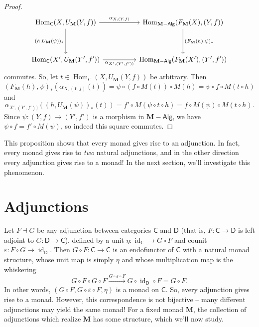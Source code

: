 \documentclass{article}
\theoremstyle{definition}
\newcommand{\C}{\mathsf{C}}
\newcommand{\D}{\mathsf{D}}
\newcommand{\M}{\mathbf{M}}
\DeclareMathOperator{\id}{id}
\newcommand{\Alg}{\mathsf{Alg}}
\DeclareMathOperator{\Hom}{Hom}
\begin{document}
\begin{proof}
    \[\begin{tikzcd}[ampersand replacement=\&]
    	{\Hom_{\C}(X,U_{\M}(Y,f))} \&\& {\Hom_{\M{-}\Alg}(F_{\M}(X),(Y,f))} \\
    	\\
    	{\Hom_{\C}(X',U_{\M}(Y',f'))} \&\& {\Hom_{\M{-}\Alg}(F_{\M}(X'),(Y',f'))}
    	\arrow["{\alpha_{X,(Y,f)}}", from=1-1, to=1-3]
    	\arrow["{(h,U_{\M}(\psi))_*}"', from=1-1, to=3-1]
    	\arrow["{\alpha_{X',(Y',f'))}}"', from=3-1, to=3-3]
    	\arrow["{(F_{\M}(h),\psi)_*}", from=1-3, to=3-3]
    \end{tikzcd}\]
    commutes. So, let $t \in {\Hom_{\C}(X,U_{\M}(Y,f))}$ be arbitrary. Then
    \[(F_{\M}(h),\psi)_*(\alpha_{X,(Y,f)}(t)) = \psi \circ (f \circ M(t)) \circ M(h) = \psi \circ f \circ M(t \circ h)\]
    and
    \[\alpha_{X',(Y',f'))}((h,U_{\M}(\psi))_*(t)) = f' \circ M(\psi \circ t \circ h) = f \circ M(\psi) \circ M(t \circ h).\]
    Since $\psi : (Y,f) \to (Y',f')$ is a morphism in $\M{-}\Alg$, we have $\psi \circ f = f' \circ M(\psi)$, so indeed this square commutes.
\end{proof}

This proposition shows that every monad gives rise to an adjunction. In fact, every monad gives rise to \emph{two} natural adjunctions, and in the other direction every adjunction gives rise to a monad! In the next section, we'll investigate this phenomenon.

\section{Adjunctions}

Let $F \dashv G$ be any adjunction between categories $\C$ and $\D$ (that is, $F : \C \to \D$ is left adjoint to $G : \D \to \C$), defined by a unit $\eta : \id_{\C} \to G \circ F$ and counit $\varepsilon : F \circ G \to \id_{\D}$. Then $G \circ F : \C \to \C$ is an endofunctor of $\C$ with a natural monad structure, whose unit map is simply $\eta$ and whose multiplication map is the whiskering
\[G \circ F \circ G \circ F \xrightarrow{G \circ \varepsilon \circ F} G \circ \id_{\D} \circ F = G \circ F.\]
In other words, $(G \circ F, G \circ \varepsilon \circ F, \eta)$ is a monad on $\C$. So, every adjunction gives rise to a monad. However, this correspondence is not bijective -- many different adjunctions may yield the same monad! For a fixed monad $\M$, the collection of adjunctions which realize $\M$ has some structure, which we'll now study.
\end{document}
